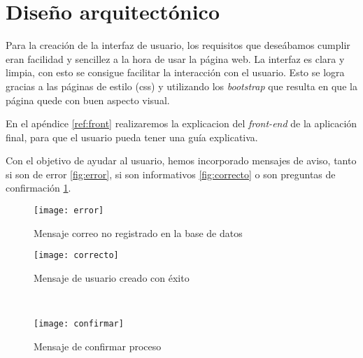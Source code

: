 \section{Diseño arquitectónico}

Para la creación de la interfaz de usuario, los requisitos que deseábamos cumplir eran facilidad y sencillez a la hora de usar la página web. La interfaz es clara y  limpia, con esto se consigue facilitar la interacción con el usuario. Esto se logra gracias a las páginas de estilo (css) y utilizando los \textit{bootstrap} que resulta en que la página quede con buen aspecto visual.

En el apéndice \ref{ref:front} realizaremos la explicacion del \textit{front-end} de la aplicación final, para que el usuario pueda tener una guía explicativa. 

Con el objetivo de ayudar al usuario, hemos incorporado mensajes de aviso, tanto si son de error \ref{fig:error}, si son informativos \ref{fig:correcto} o son preguntas de confirmación \ref{fig:confirmar}.

\begin{figure}[H]
	\begin{minipage}[b]{0.5\linewidth}
		\centering
		\texttt{[image: error]}
		\caption{Mensaje correo no registrado en la base de datos}
		\label{fig:error}
	\end{minipage}
	\hspace{0.3cm}
	\begin{minipage}[b]{0.5\linewidth}
		\centering
		\texttt{[image: correcto]}
		\caption{Mensaje de usuario creado con éxito}
		\label{fig:correcto}
	\end{minipage}
	\\
	\begin{minipage}[b]{0.5\linewidth}
		\centering
		\texttt{[image: confirmar]}
		\caption{Mensaje de confirmar proceso}
		\label{fig:confirmar}
	\end{minipage}
\end{figure}






